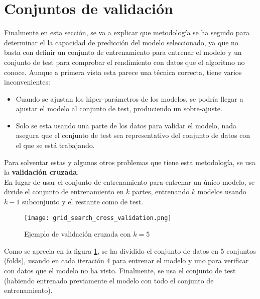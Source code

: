\section{Conjuntos de validación}
\label{sec:validation}
Finalmente en esta sección, se va a explicar que metodología se ha seguido para determinar el la capacidad de predicción del modelo seleccionado, ya que no basta con definir un conjunto de entrenamiento para entrenar el modelo y un conjunto de test para comprobar el rendimiento con datos que el algoritmo no conoce. Aunque a primera vista esta parece una técnica correcta, tiene varios inconvenientes:
\begin{itemize}
	\item Cuando se ajustan los hiper-parámetros de los modelos, se podría llegar a ajustar el modelo al conjunto de test, produciendo un sobre-ajuste.
	\item Solo se esta usando una parte de los datos para validar el modelo, nada asegura que el conjunto de test sea representativo del conjunto de datos con el que se está trabajando.
\end{itemize}
Para solventar estas y algunos otros problemas que tiene esta metodología, se usa la \textbf{validación cruzada}.\\
\linebreak
En lugar de usar el conjunto de entrenamiento para entrenar un único modelo, se divide el conjunto de entrenamiento en $k$ partes, entrenando $k$ modelos usando $k-1$ subconjunto y el restante como de test. \\
\begin{figure}[H]
	\centering
	\texttt{[image: grid\_search\_cross\_validation.png]}
	\caption{Ejemplo de validación cruzada con $k=5$}
	\label{fig:cross-validation}
\end{figure}
Como se aprecia en la figura \ref{fig:cross-validation}, se ha dividido el conjunto de datos en 5 conjuntos (folds), usando en cada iteración 4 para entrenar el modelo y uno para verificar con datos que el modelo no ha visto. Finalmente, se usa el conjunto de test (habiendo entrenado previamente el modelo con todo el conjunto de entrenamiento).
